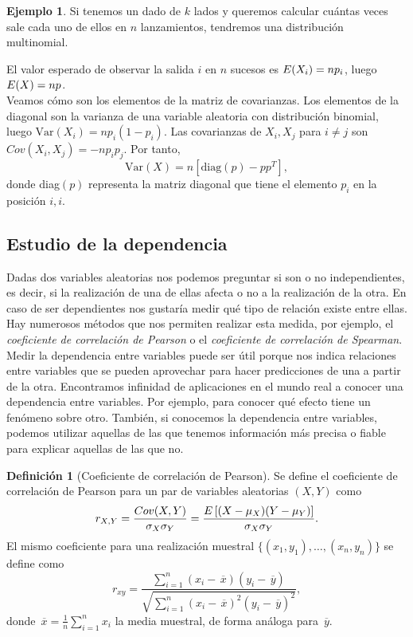 \documentclass[12pt,a4paper]{report} %
\let\mathbb\relax
\newcommand{\Var}{\text{Var}}
\newcommand{\olsi}[1]{\,\overline{\!{#1}}} %
\theoremstyle{definition}
\newtheorem{definition}{Definición}[section]
\newtheorem{example}[theorem]{Ejemplo}
\begin{document}
\begin{example}
  Si tenemos un dado de $k$ lados y queremos calcular cuántas veces sale cada uno de ellos en $n$ lanzamientos, tendremos una distribución multinomial.\\
\end{example}

El valor esperado de observar la salida $i$ en $n$ sucesos es $\mathbb{E}(X_i) = np_i$, luego $\mathbb{E}(X) = np$.\\

Veamos cómo son los elementos de la matriz de covarianzas. Los elementos de la diagonal son la varianza de una variable aleatoria con distribución binomial, luego $\Var(X_i) = np_i(1-p_i)$. Las covarianzas de $X_i, X_j$ para $i\neq j$ son $Cov(X_i, X_j) = - n p_i p_j$. Por tanto,\[\Var(X) = n [\text{diag}(p) - p p^T],\] donde diag$(p)$ representa la matriz diagonal que tiene el elemento $p_i$ en la posición $i,i$.\\

\subsection{Estudio de la dependencia}

Dadas dos variables aleatorias nos podemos preguntar si son o no independientes, es decir, si la realización de una de ellas afecta o no a la realización de la otra. En caso de ser dependientes nos gustaría medir qué tipo de relación existe entre ellas. Hay numerosos métodos que nos permiten realizar esta medida, por ejemplo, el \textit{coeficiente de correlación de Pearson} o el \textit{coeficiente de correlación de Spearman}.\\

Medir la dependencia entre variables puede ser útil porque nos indica relaciones entre variables que se pueden aprovechar para hacer predicciones de una a partir de la otra. Encontramos infinidad de aplicaciones en el mundo real a conocer una dependencia entre variables. Por ejemplo, para conocer qué efecto tiene un fenómeno sobre otro. También, si conocemos la dependencia entre variables, podemos utilizar aquellas de las que tenemos información más precisa o fiable para explicar aquellas de las que no.\\

\begin{definition}[Coeficiente de correlación de Pearson]
  Se define el coeficiente de correlación de Pearson para un par de variables aleatorias $(X,Y)$ como\[
r_{X,Y} = \frac{Cov(X,Y)}{\sigma_X\sigma_Y} = \frac{\mathbb{E}\left [ (X- \mu_X)(Y-\mu_Y)\right ]}{\sigma_X\sigma_Y}.
\]
El mismo coeficiente para una realización muestral $\{(x_1,y_1),\dots,(x_n,y_n)\}$ se define como
\[
r_{xy}=\frac{\sum_{i=1}^n(x_i-\olsi{x})(y_i-\olsi{y})}{\sqrt{\sum_{i=1}^n(x_i-\olsi{x})^2(y_i-\olsi{y})^2}},
\] donde $\olsi{x} = \frac{1}{n}\sum_{i=1}^nx_i$ la media muestral, de forma análoga para $\olsi{y}$.\\
\end{definition}
\end{document}
